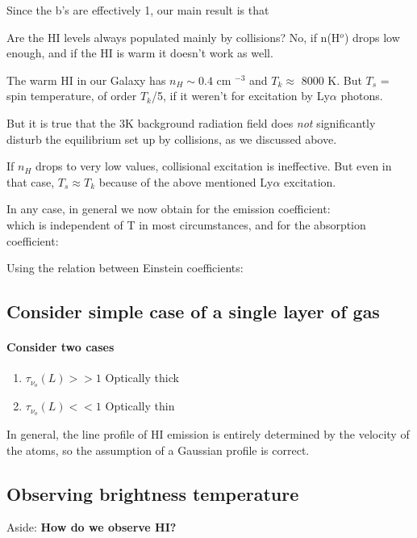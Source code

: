 \documentclass[12pt]{article}
\newcommand{\mar}[1]{\hspace{0pt}\marginpar{-\textcolor{black}{#1}-}}
\begin{document}
\mar{37}
Since the b's are effectively 1, our \textcolor{bred}{main result}
is that$${
}$$

Are the HI levels always populated mainly by collisions? No, if n(H$^{o}$) drops
low enough, and if the HI is warm it doesn't work as well.

The warm HI in our Galaxy has $n_{H}\sim0.4$ cm $^{-3}$ and $T_{k} \approx$ 8000 K.
But $T_{s}$ = spin temperature, of order $T_{k}$/5, if it weren't for
excitation by Ly$\alpha$ photons.

But it is true that the 3K background radiation field does \emph{not}
significantly disturb the equilibrium set up by collisions, as we
discussed above.

If $n_{H}$ drops to very low values, collisional excitation is ineffective.
But even in that case, $T_{s} \approx T_{k}$ because of the above mentioned
Ly$\alpha$ excitation.

In any case, in general we now obtain for the emission coefficient:
$${
}$$
which is independent of T in most circumstances, and for the absorption
coefficient:
$${
}$$


\mar{38}
Using the relation between Einstein coefficients:

\subsection{Consider simple case of a single layer of gas}

\mar{39}
\paragraph{Consider two cases}
\begin{enumerate}[label={(\roman*)}]
    \item $\tau_{\nu_{o}}(L) >> 1$ Optically thick
    \item $\tau_{\nu_{o}}(L) << 1$ Optically thin
\end{enumerate}
In general, the line profile of HI emission is entirely determined by the velocity
of the atoms, so the assumption of a Gaussian profile is correct.

\mar{40}
\subsection{Observing brightness temperature}

\begin{tcolorbox}
    Aside: \textbf{How do we observe HI?}
\end{tcolorbox}
\end{document}
